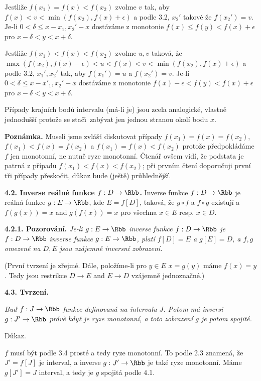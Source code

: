 \documentclass[12pt]{article}
\begin{document}
{ 
 Jestliže $f(x_1)=f(x)<f(x_2)$ zvolme $v$ tak, aby $f(x)<v<\min(f(x_2),f(x)+\epsilon)$ a podle 3.2, $x_2'$ takové že $f(x_2')=v$.
Je-li $0<\delta\leq x-x_1,x_2'-x$ dostáváme z monotonie
 $f(x)\leq f(y)<f(x)+\epsilon$ pro $x-\delta<y<x+\delta$.
 
 Jestliže $f(x_1)<f(x)<f(x_2)$ zvolme $u,v$ taková, že $\max(f(x_2),f(x)-\epsilon)<u<f(x)<v<\min(f(x_2),f(x)+\epsilon)$ a podle 3.2,  $x_1',x_2'$ tak, aby $f(x_1')=u$ a $f(x_2')=v$.
  Je-li $0<\delta\leq x-x'_1,x_2'-x$ dostáváme z monotonie
 $f(x)-\epsilon< f(y)<f(x)+\epsilon$ pro $x-\delta<y<x+\delta$.
 
 \smallskip
 
 Případy krajních bodů intervalu (má-li je) jsou zcela analogické, vlastně jednodušší protože se sta\v c\'\i\  zabývat jen jednou stranou okolí bodu $x$. \sq
 
 \medskip
 
 {\bf Poznámka.} Museli jsme zvlášť diskutovat případy $f(x_1)=f(x)=f(x_2)$, $f(x_1)< f(x) =f(x_2)$ a $f(x_1)=f(x)<f(x_2)$ protože předpokládáme $f$ jen monotonní, ne nutně ryze monotonní. Čtenář ovšem vidí, že podstata je patrná z případu $f(x_1)<f(x)<f(x_2)$; při prvním čtení doporučuji první tři případy přeskočit, důkaz bude (ještě) průhlednější.
 
 \bigskip
 
 
 {\bf 4.2. Inverse  reálné funkce $f:D\to \Rbb$.} Inverse funkce $f:D\to \Rbb$ je reálná funkce $g:E\to\Rbb$, kde $E=f[D]$, taková, že $g\circ f$ a $f\circ g$ existují a
 $f(g(x))=x$ and $g(f(x))=x$ pro všechna $x\in E$ resp.  $x\in D$.
 
 \smallskip
 
 {\bf 4.2.1. Pozorování.} {\em Je-li $g:E\to\Rbb$ inverse funkce $f:D\to\Rbb$ je
 $f:D\to\Rbb$ inverse funkce $g:E\to\Rbb$, platí $f[D]=E$ a $g[E]=D$, a $f,g$ omezené na $D,E$ jsou vzájemně inversní zobrazení.}
 
 (První tvrzení je zřejmé. Dále, položíme-li pro $y\in E$ $x=g(y)$ máme $f(x)=y$. Tedy jsou restrikce  $D\to E$ and $E\to D$ vzájemně jednoznačné.)
 
 \bigskip
 
 {\bf 4.3. Tvrzení.} {\em Buď  $f:J\to\Rbb$ funkce definovaná na intervalu $J$. Potom má inversi $g:J'\to\Rbb$ právě když je ryze monotonní, a toto zobrazení $g$ je potom spojité.
 
 Důkaz.} $f$ musí být podle 3.4 prosté a tedy ryze monotonní. To podle 2.3 znamená, že $J'=f[J]$ je interval, a inverse $g:J'\to\Rbb$ je také ryze monotonní. Máme $g[J']=J$ interval, a tedy je $g$ spojitá podle 4.1. \sq
 
}
\end{document}
